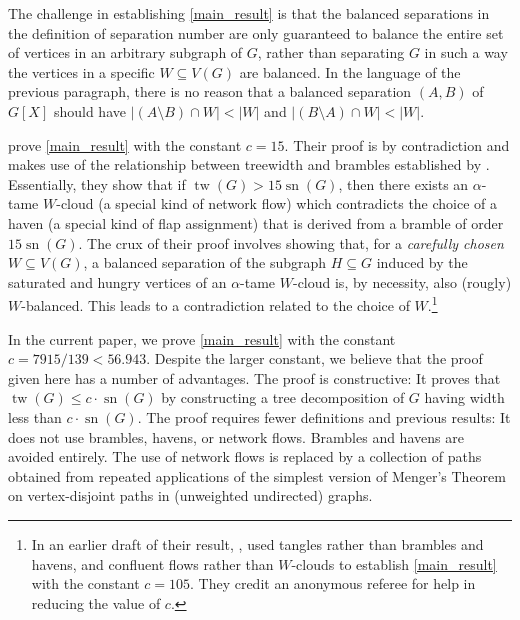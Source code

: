 \documentclass{patmorin}
\DeclareMathOperator{\sep}{sn}
\DeclareMathOperator{\tw}{tw}
\begin{document}
The challenge in establishing \cref{main_result} is that the balanced separations in the definition of separation number are only guaranteed to balance the entire set of vertices in an arbitrary subgraph of $G$, rather than separating $G$ in such a way the vertices in a specific $W\subseteq V(G)$ are balanced.  In the language of the previous paragraph, there is no reason that a balanced separation $(A,B)$ of $G[X]$ should have $|(A\setminus B)\cap W|<|W|$ and $|(B\setminus A)\cap W|<|W|$.

\citet{dvorak.norin:treewidth} prove \cref{main_result} with the constant $c=15$. Their proof is by contradiction and makes use of the relationship between treewidth and brambles established by \citet{seymour.thomas:graph}.  Essentially, they show that if $\tw(G)>15\sep(G)$, then there exists an $\alpha$-tame $W$-cloud (a special kind of network flow) which contradicts the choice of a haven (a special kind of flap assignment) that is derived from a bramble of order $15\sep(G)$.  The crux of their proof \cite[Proof of Lemma~7]{dvorak.norin:treewidth} involves showing that, for a \emph{carefully chosen} $W\subseteq V(G)$, a balanced separation of the subgraph $H\subseteq G$ induced by the saturated and hungry vertices of an $\alpha$-tame $W$-cloud is, by necessity, also (rougly) $W$-balanced. This leads to a contradiction related to the choice of $W$.\footnote{In an earlier draft of their result, \citet{dvorak.norin:treewidth_v1}, used tangles rather than brambles and havens, and confluent flows \cite{chen.kleinberg.ea:almost} rather than $W$-clouds to establish \cref{main_result} with the constant $c=105$.  They credit an anonymous referee for help in reducing the value of $c$.}

In the current paper, we prove \cref{main_result} with the constant $c=7915/139< 56.943$.  Despite the larger constant, we believe that the proof given here has a number of advantages.  The proof is constructive: It proves that $\tw(G)\le c\cdot \sep(G)$ by constructing a tree decomposition of $G$ having width less than $c\cdot\sep(G)$.  The proof requires fewer definitions and previous results: It does not use brambles, havens, or network flows.  Brambles and havens are avoided entirely.  The use of network flows is replaced by a collection of paths obtained from repeated applications of the simplest version of Menger's Theorem on vertex-disjoint paths in (unweighted undirected) graphs.
\end{document}
